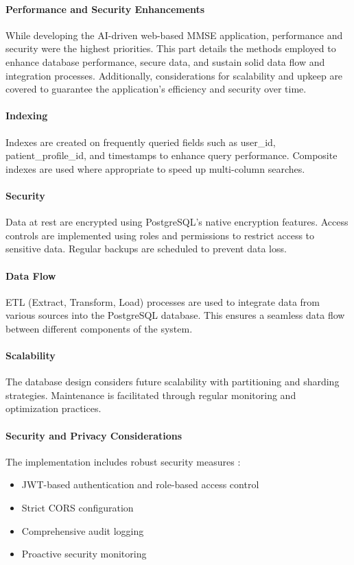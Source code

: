 \paragraph{Performance and Security Enhancements}
While developing the AI-driven web-based MMSE application, performance and security were the highest priorities. This part details the methods employed to enhance database performance, secure data, and sustain solid data flow and integration processes. Additionally, considerations for scalability and upkeep are covered to guarantee the application's efficiency and security over time.

\paragraph{Indexing}
Indexes are created on frequently queried fields such as user\_id, patient\_profile\_id, and timestamps to enhance query performance. Composite indexes are used where appropriate to speed up multi-column searches.

\paragraph{Security}
Data at rest are encrypted using PostgreSQL's native encryption features. Access controls are implemented using roles and permissions to restrict access to sensitive data. Regular backups are scheduled to prevent data loss.

\paragraph{Data Flow}
ETL (Extract, Transform, Load) processes are used to integrate data from various sources into the PostgreSQL database. This ensures a seamless data flow between different components of the system.

\paragraph{Scalability}
The database design considers future scalability with partitioning and sharding strategies. Maintenance is facilitated through regular monitoring and optimization practices.

\paragraph{Security and Privacy Considerations}
The implementation includes robust security measures \cite{owasp2021top10}:
\begin{itemize}
    \item JWT-based authentication and role-based access control
    \item Strict CORS configuration
    \item Comprehensive audit logging
    \item Proactive security monitoring
\end{itemize}


